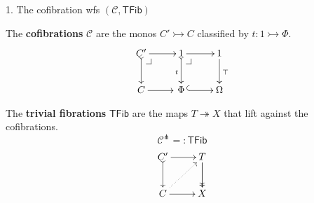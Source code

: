 \documentclass[handout]{beamer}
\makeatletter
\newcommand{\myemph}[1]{\textbf{#1}}    %
\newcommand{\pbcorner}[1][dr]{\save*!/#1-1.2pc/#1:(-1,1)@^{|-}\restore}
\newcommand{\ra}{\ensuremath{\rightarrow}}
\newcommand{\mono}{\rightarrowtail}
\renewcommand{\epi}{\twoheadrightarrow}
\newcommand{\EE}{\mathcal{E}}
\newcommand{\U}{\mathsf{U}}
\newcommand{\UU}{\dot{\mathsf{U}}}
\newcommand{\V}{\mathsf{V}}
\newcommand{\VV}{\dot{\mathsf{V}}}
\newcommand{\II}{\mathbb{I}}
\theoremstyle{remark}
\makeatother
\begin{document}
%
%
%
%
%
%
\begin{frame}{1. The cofibration wfs $(\mathcal{C},\mathsf{TFib})$}

The \myemph{cofibrations} $\mathcal{C}$ are the monos $C' \mono C$ classified by $t : 1 \mono \Phi$.
\[
\xymatrix{
C'\ar@{>->}[d] \ar[r] \pbcorner & 1 \ar@{>->}[d]_t \ar[r] \pbcorner & 1 \ar[d]^{\top}\\
C \ar[r]  &\, \Phi\, \ar@{^(->}[r]  & \Omega 
}
\]

The \myemph{trivial fibrations} $\mathsf{TFib}$ are the maps $T\epi X$  that lift against the cofibrations.
 \[
\mathcal{C}^{\pitchfork}
 =: \mathsf{TFib}
\]
\[
\xymatrix{
 C' \ar@{>->}[d] \ar[r] & T  \ar@{->>}[d]\ar[d]\\
 C \ar[r] \ar@{..>}[ru] & X
}
\]

\end{frame}
\end{document}
